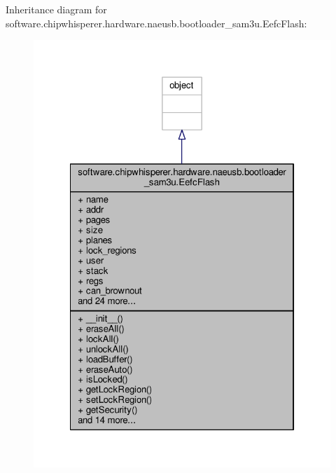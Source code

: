 Inheritance diagram for software.\+chipwhisperer.\+hardware.\+naeusb.\+bootloader\+\_\+sam3u.\+Eefc\+Flash\+:\nopagebreak
\begin{figure}[H]
\begin{center}
\leavevmode
\includegraphics[width=322pt]{df/dc4/classsoftware_1_1chipwhisperer_1_1hardware_1_1naeusb_1_1bootloader__sam3u_1_1EefcFlash__inherit__graph}
\end{center}
\end{figure}


